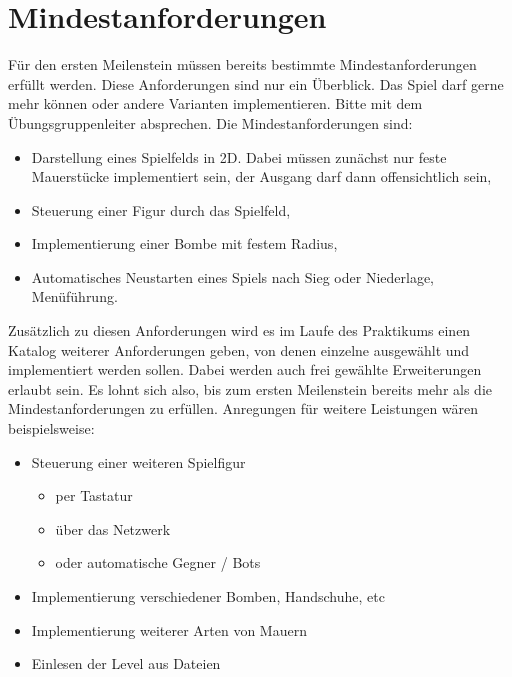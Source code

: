 \documentclass{programmierpraktikum}
\begin{document}
\section{Mindestanforderungen}
Für den ersten Meilenstein müssen bereits bestimmte Mindestanforderungen erfüllt werden. Diese
Anforderungen sind nur ein Überblick. Das Spiel darf gerne mehr können oder andere Varianten
implementieren. Bitte mit dem Übungsgruppenleiter absprechen.
Die Mindestanforderungen sind:
\begin{itemize}
  \item Darstellung eines Spielfelds in 2D. Dabei müssen zunächst nur feste Mauerstücke implementiert sein, der Ausgang darf dann offensichtlich sein,
  \item Steuerung einer Figur durch das Spielfeld,
  \item Implementierung einer Bombe mit festem Radius,
  \item Automatisches Neustarten eines Spiels nach Sieg oder Niederlage, Menüführung.
\end{itemize}
Zusätzlich zu diesen Anforderungen wird es im Laufe des Praktikums einen Katalog weiterer
Anforderungen geben, von denen einzelne ausgewählt und implementiert werden sollen. Dabei
werden auch frei gewählte Erweiterungen erlaubt sein. Es lohnt sich also, bis zum ersten Meilenstein
bereits mehr als die Mindestanforderungen zu erfüllen.
Anregungen für weitere Leistungen wären beispielsweise:
\begin{itemize}
  \item Steuerung einer weiteren Spielfigur
    \begin{itemize}
      \item per Tastatur
      \item über das Netzwerk
      \item oder automatische Gegner / Bots
    \end{itemize}
  \item Implementierung verschiedener Bomben, Handschuhe, etc
  \item Implementierung weiterer Arten von Mauern
  \item Einlesen der Level aus Dateien
\end{itemize}
\end{document}
